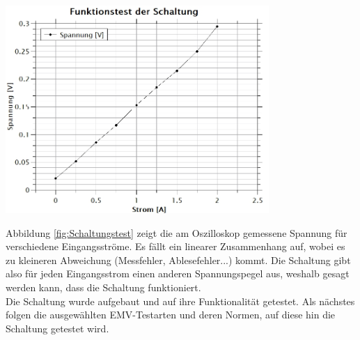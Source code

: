 \begin{minipage}[b][6cm][t]{1\textwidth}
\centering
\includegraphics[angle=0,width=0.75\textwidth]{graphics/Schaltungstest.jpg}
\label{fig:Schaltungstest}
\end{minipage}
\vspace*{4cm}

Abbildung \ref{fig:Schaltungstest} zeigt die am Oszilloskop gemessene Spannung für verschiedene Eingangsströme. Es fällt ein linearer Zusammenhang auf, wobei es zu kleineren Abweichung (Messfehler, Ablesefehler...) kommt. Die Schaltung gibt also für jeden Eingangsstrom einen anderen Spannungspegel aus, weshalb gesagt werden kann, dass die Schaltung funktioniert.\\

Die Schaltung wurde aufgebaut und auf ihre Funktionalität getestet. Als nächstes folgen die ausgewählten EMV-Testarten und deren Normen, auf diese hin die Schaltung getestet wird.\\


